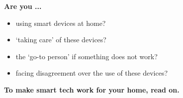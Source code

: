 \documentclass[10pt,nocombine]{leaflet}
\begin{document}



\clearpage
{\huge\bfseries\color{cobalt} Are you ...}\\

\begin{onehalfspacing}
\flushleft
\begin{itemize}[label=\Huge\bfseries\faHome,labelsep=10pt,leftmargin=40pt]
    \item \huge using smart devices at home?\vfill
    \item \huge `taking care' of these devices?\vfill
    \item \huge the `go-to person' if something does not work?\vfill
    \item \huge facing disagreement over the use of these devices?
\end{itemize}
\end{onehalfspacing}

\vfill

\begin{onehalfspacing}
\huge\bfseries\color{cobalt} 
To make smart tech work for your home, read on.
\end{onehalfspacing}
\vspace{1cm}
\end{document}
